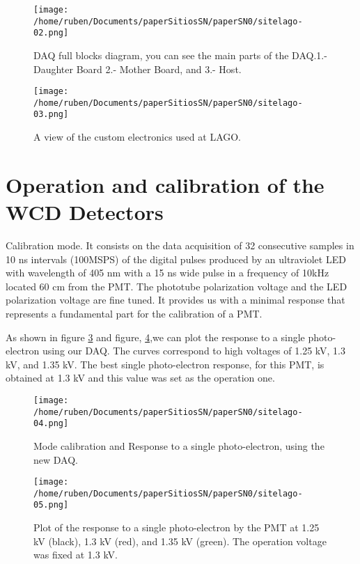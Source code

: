 \documentclass[a4paper]{article}
\begin{document}
\begin{figure}[t]
\centering
\texttt{[image: /home/ruben/Documents/paperSitiosSN/paperSN0/sitelago-02.png]}
\caption{DAQ full blocks diagram, you can see the main parts of the DAQ.1.- Daughter Board 2.- Mother Board, and 3.- Host.}
\label{sitelago02}
\end{figure} 

\begin{figure}[t]
\centering
\texttt{[image: /home/ruben/Documents/paperSitiosSN/paperSN0/sitelago-03.png]}
\caption{A view of the custom electronics used at LAGO.}
\label{sitelago03}
\end{figure} 

\section{Operation and calibration of the WCD Detectors}

Calibration mode. It consists on the data acquisition of 32 consecutive samples
in 10 ns intervals (100MSPS) of the digital pulses produced by an ultraviolet
LED with wavelength of 405 nm with a 15 ns wide pulse in a frequency of 10kHz
located 60 cm from the PMT. The phototube polarization voltage and the LED
polarization voltage are fine tuned. It provides us with a minimal response
that represents a fundamental part for the calibration of a PMT.

As shown in figure \ref{sitelago04} and figure, \ref{sitelago05},we can plot the response to a single photo-electron using
our DAQ. The curves correspond to high voltages of 1.25 kV, 1.3 kV,
and 1.35 kV. The best single photo-electron response, for this PMT, is obtained
at 1.3 kV and this value was set as the operation one.
 

\begin{figure}[t]
\centering
\texttt{[image: /home/ruben/Documents/paperSitiosSN/paperSN0/sitelago-04.png]}
\caption{Mode calibration and Response to a single photo-electron, using the new DAQ.}
\label{sitelago04}
\end{figure} 

\begin{figure}[t]
\centering
\texttt{[image: /home/ruben/Documents/paperSitiosSN/paperSN0/sitelago-05.png]}
\caption{Plot of the response to a single photo-electron by the PMT at 1.25 kV (black), 1.3 kV (red), and 1.35 kV (green). The operation voltage was fixed at 1.3 kV.}
\label{sitelago05}
\end{figure} 
\end{document}
